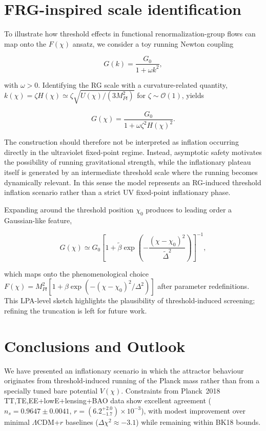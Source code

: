 \documentclass[
]{article}
\begin{document}
\section{FRG-inspired scale
identification}\label{frg-inspired-scale-identification}

To illustrate how threshold effects in functional renormalization-group
flows can map onto the \(F(\chi)\) ansatz, we consider a toy running
Newton coupling

\[
G(k) = \frac{G_{0}}{1 + \omega k^{2}},
\]

with \(\omega > 0\). Identifying the RG scale with a curvature-related
quantity,
\(k(\chi) = \zeta H(\chi) \simeq \zeta\sqrt{U(\chi)/(3M_{Pl}^{2})}\) for
\(\zeta \sim \mathcal{O}(1)\), yields

\[
G(\chi) = \frac{G_{0}}{1 + \omega\zeta^{2}H(\chi)^{2}}.
\]

The construction should therefore not be interpreted as inflation
occurring directly in the ultraviolet fixed-point regime. Instead,
asymptotic safety motivates the possibility of running gravitational
strength, while the inflationary plateau itself is generated by an
intermediate threshold scale where the running becomes dynamically
relevant. In this sense the model represents an RG-induced threshold
inflation scenario rather than a strict UV fixed-point inflationary
phase.

Expanding around the threshold position \(\chi_{0}\) produces to leading
order a Gaussian-like feature,

\[
G(\chi) \simeq G_{0}\left\lbrack 1 + \widetilde{\beta}\exp\left( - \frac{(\chi - \chi_{0})^{2}}{{\widetilde{\Delta}}^{2}} \right) \right\rbrack^{- 1},
\]

which maps onto the phenomenological choice
\(F(\chi) = M_{Pl}^{2}\left\lbrack 1 + \beta\exp( - (\chi - \chi_{0})^{2}/\Delta^{2}) \right\rbrack\)
after parameter redefinitions. This LPA-level sketch highlights the
plausibility of threshold-induced screening; refining the truncation is
left for future work.

\section{Conclusions and Outlook}\label{conclusions-and-outlook}

We have presented an inflationary scenario in which the attractor
behaviour originates from threshold-induced running of the Planck mass
rather than from a specially tuned bare potential \(V(\chi)\).
Constraints from Planck~2018 TT,TE,EE+lowE+lensing+BAO data show
excellent agreement (\(n_{s} = 0.9647 \pm 0.0041\),
\(r = ({6.2}_{-1.7}^{+2.0}) \times 10^{-3}\)), with modest improvement
over minimal \(\Lambda\)CDM+\(r\) baselines
(\(\Delta\chi^{2} \approx -3.1\)) while remaining within BK18 bounds.
\end{document}
